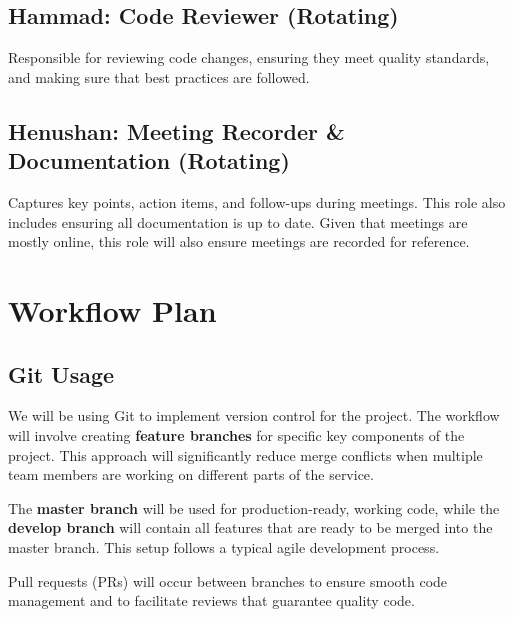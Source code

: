 \documentclass{article}
\begin{document}
\subsection*{Hammad: Code Reviewer (Rotating)}
Responsible for reviewing code changes, ensuring they meet quality standards, and making sure that best practices are followed.



\subsection*{Henushan: Meeting Recorder \& Documentation (Rotating)}
Captures key points, action items, and follow-ups during meetings. This role also includes ensuring all documentation is up to date. Given that meetings are mostly online, this role will also ensure meetings are recorded for reference.



\section{Workflow Plan}

\subsection*{Git Usage}
We will be using Git to implement version control for the project. The workflow will involve creating \textbf{feature branches} for specific key components of the project. This approach will significantly reduce merge conflicts when multiple team members are working on different parts of the service.

The \textbf{master branch} will be used for production-ready, working code, while the \textbf{develop branch} will contain all features that are ready to be merged into the master branch. This setup follows a typical agile development process.

Pull requests (PRs) will occur between branches to ensure smooth code management and to facilitate reviews that guarantee quality code.
\end{document}
